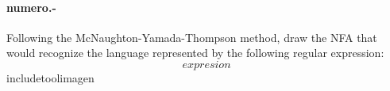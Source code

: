 

\paragraph{{numero}.-}\label{p{numero}}
Following the McNaughton-Yamada-Thompson method, draw the NFA that would recognize the language represented by the following regular expression:
\[
    {expresion}
\]
    {includetool}{{imagen}}
